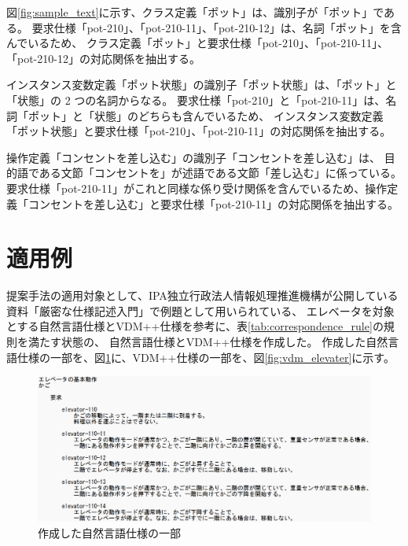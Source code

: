 \documentclass[a4j,twocolumn,10pt]{jceee-kyushu-euc}
\begin{document}
図\ref{fig:sample_text}に示す、クラス定義「ポット」は、識別子が「ポット」である。
要求仕様「pot-210」、「pot-210-11」、「pot-210-12」は、名詞「ポット」を含んでいるため、
クラス定義「ポット」と要求仕様「pot-210」、「pot-210-11」、「pot-210-12」の対応関係を抽出する。

インスタンス変数定義「ポット状態」の識別子「ポット状態」は、「ポット」と「状態」の 2 つの名詞からなる。
要求仕様「pot-210」と「pot-210-11」は、名詞「ポット」と「状態」のどちらも含んでいるため、
インスタンス変数定義「ポット状態」と要求仕様「pot-210」、「pot-210-11」の対応関係を抽出する。

操作定義「コンセントを差し込む」の識別子「コンセントを差し込む」は、
目的語である文節「コンセントを」が述語である文節「差し込む」に係っている。
要求仕様「pot-210-11」がこれと同様な係り受け関係を含んでいるため、操作定義「コンセントを差し込む」と要求仕様「pot-210-11」の対応関係を抽出する。

\section{適用例}
提案手法の適用対象として、IPA独立行政法人情報処理推進機構が公開している資料「厳密な仕様記述入門」\cite{spec_introduction}で例題として用いられている、
エレベータを対象とする自然言語仕様とVDM++仕様を参考に、表\ref{tab:correspondence_rule}の規則を満たす状態の、
自然言語仕様とVDM++仕様を作成した。
作成した自然言語仕様の一部を、図\ref{fig:nat_elevater}に、VDM++仕様の一部を、図\ref{fig:vdm_elevater}に示す。

\begin{figure}[tp]
      \centering
      \includegraphics[width=\columnwidth]{../image/jceee/elevater.png}
      \caption{作成した自然言語仕様の一部}
      \label{fig:nat_elevater}
\end{figure}
\end{document}
